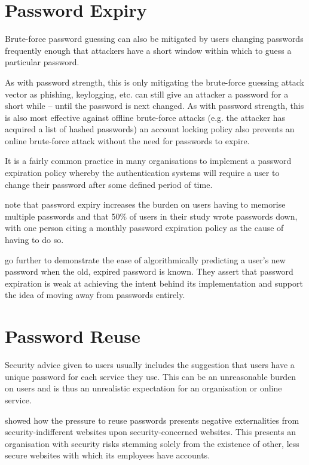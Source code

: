 \documentclass{report}
\begin{document}
\section{Password Expiry}

Brute-force password guessing can also be mitigated by
users changing passwords frequently enough that attackers
have a short window within which to guess a particular
password.

As with password strength, this is only mitigating the
brute-force guessing attack vector as phishing, keylogging, etc.
can still give an attacker a password for a short while -- until
the password is next changed. As with password strength, this
is also most effective against offline brute-force attacks (e.g.
the attacker has acquired a list of hashed passwords) an
account locking policy also prevents an online brute-force
attack without the need for passwords to expire.

It is a fairly common practice in many organisations to
implement a password expiration policy whereby the
authentication systems will require a user to change their
password after some defined period of time.

\cite{adams1999users} note that password expiry increases
the burden on users having to memorise multiple passwords and that
50\% of users in their study wrote passwords down, with one
person citing a monthly password expiration policy as the cause
of having to do so.

\cite{zhang2010security} go further to demonstrate the ease of
algorithmically predicting a user's new password when the old,
expired password is known. They assert that password expiration
is weak at achieving the intent behind its implementation and
support the idea of moving away from passwords entirely.

\section{Password Reuse}

Security advice given to users usually includes the suggestion that users
have a unique password for each service they use. This can
be an unreasonable burden on users\parencite{florencio2014password}
and is thus an unrealistic expectation for an organisation or online
service.

\cite{preibusch2010password} showed how the pressure to reuse passwords
presents negative externalities from security-indifferent websites upon
security-concerned websites. This presents an organisation with
security risks stemming solely from the existence of other, less
secure websites with which its employees have accounts.
\end{document}
